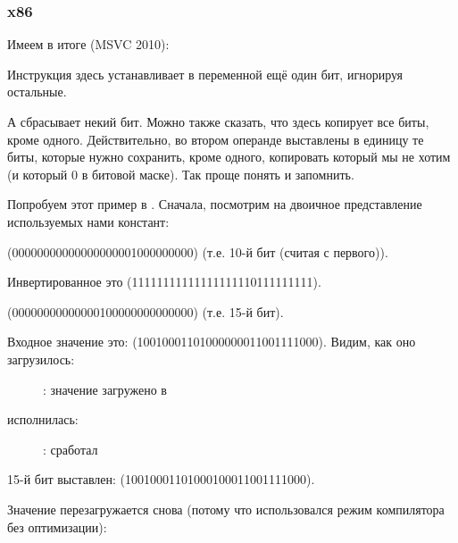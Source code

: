 \subsubsection{x86}


Имеем в итоге (MSVC 2010):



Инструкция \OR здесь устанавливает в переменной ещё один бит, игнорируя остальные.

А \AND сбрасывает некий бит. Можно также сказать, что \AND здесь копирует все биты, кроме одного. 
Действительно, во втором операнде \AND выставлены в единицу те биты, которые нужно сохранить, 
кроме одного, копировать который мы не хотим (и который 0 в битовой маске).
Так проще понять и запомнить.

\clearpage
\mysubparagraph{\olly}

Попробуем этот пример в \olly.
Сначала, посмотрим на двоичное представление используемых нами констант:

 (0000000000000000000{\color{red}1}000000000) (т.е. 10-й бит (считая с первого)).

Инвертированное  это  (1111111111111111111{\color{red}0}111111111).

 (00000000000000{\color{red}1}00000000000000) (т.е. 15-й бит).

Входное значение это:  (10010001101000000011001111000).
Видим, как оно загрузилось:

\begin{figure}[H]
\centering
{}
\caption{\olly: значение загружено в \ECX}
\label{fig:set_reset_olly1}
\end{figure}

\clearpage
\OR исполнилась:

\begin{figure}[H]
\centering
{}
\caption{\olly: \OR сработал}
\label{fig:set_reset_olly2}
\end{figure}

15-й бит выставлен:  
(10010001101000{\color{red}1}00011001111000).

\clearpage
Значение перезагружается снова (потому что использовался режим компилятора без оптимизации): 


